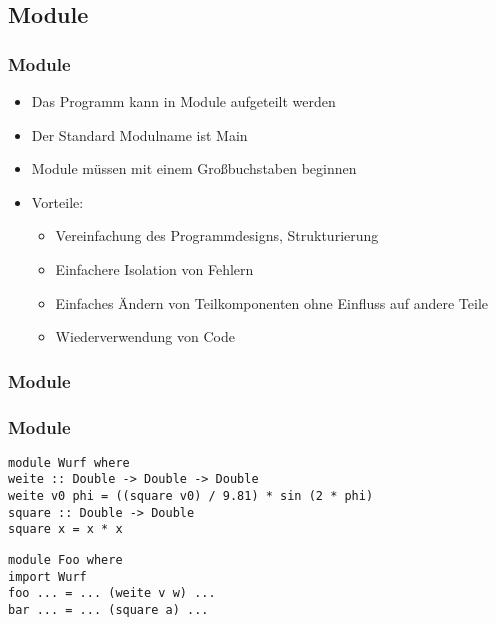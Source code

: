 \subsection{Module}
\begin{frame}
\frametitle{Module}
\begin{block}{\vspace*{-3ex}}
\begin{itemize}
  \item Das Programm kann in Module aufgeteilt werden
  \item Der Standard Modulname ist Main
  \item Module müssen mit einem Großbuchstaben beginnen
  \item Vorteile: \\
    \begin{itemize}
      \item Vereinfachung des Programmdesigns, Strukturierung
      \item Einfachere Isolation von Fehlern
      \item Einfaches Ändern von Teilkomponenten ohne Einfluss auf andere Teile
      \item Wiederverwendung von Code
    \end{itemize}
\end{itemize}
\end{block}
\end{frame}

\begin{frame}[fragile]
\frametitle{Module}
\begin{block}{\vspace*{-3ex}}
\begin{center}
\scalebox{1}{}
\end{center}
\end{block} 
\end{frame}

\begin{frame}[fragile]
\frametitle{Module} 
\begin{lstlisting}
module Wurf where
weite :: Double -> Double -> Double
weite v0 phi = ((square v0) / 9.81) * sin (2 * phi)
square :: Double -> Double
square x = x * x
\end{lstlisting}
\begin{lstlisting}
module Foo where
import Wurf
foo ... = ... (weite v w) ...
bar ... = ... (square a) ...
\end{lstlisting}
\end{frame}

